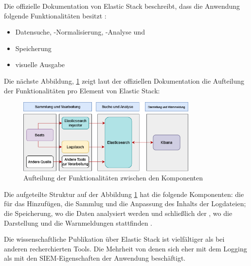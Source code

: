 Die offizielle Dokumentation von Elastic Stack beschreibt, dass die Anwendung folgende Funktionalitäten besitzt \citep{elastic_docs}:

\begin{itemize}[noitemsep]
   \item Datensuche, -Normalisierung, -Analyse und
   \item Speicherung
   \item visuelle Ausgabe
\end{itemize}

Die nächste Abbildung, \ref{fig:ElasticKomponenten} zeigt laut der offiziellen Dokumentation die Aufteilung der Funktionalitäten pro Element von Elastic Stack:

\begin{figure}[H]
   \centering
   \includegraphics[width=0.8\textwidth]{assets/ELK_Architektur.png}
   \caption[Aufteilung der Funktionalitäten zwischen den Komponenten]
   {Aufteilung der Funktionalitäten zwischen den Komponenten}
   \label{fig:ElasticKomponenten}
   \centering
\end{figure}

Die aufgeteilte Struktur auf der Abbildung \ref{fig:ElasticKomponenten} hat die folgende Komponenten: die  für das Hinzufügen, die Sammlug und die Anpassung des Inhalts der Logdateien; die Speicherung, wo die Daten analysiert werden und schließlich der , wo die Darstellung und die Warnmeldungen stattfinden \citep{elastic_docs}.


Die wissenschaftliche Publikation über Elastic Stack ist vielfältiger als bei anderen recherchierten Tools. Die Mehrheit von denen sich eher mit dem Logging als mit den \gls{SIEM}-Eigenschaften der Anwendung beschäftigt.

